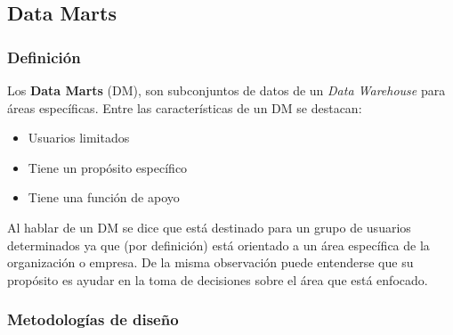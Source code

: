 \documentclass[a4paper,11pt]{article}
\begin{document}
    \subsection{Data Marts}
    
    \subsubsection{Definición}

    Los \textbf{Data Marts} (DM), son subconjuntos de datos de un \textit{Data Warehouse} para áreas específicas.
    Entre las características de un DM se destacan:
    
    \begin{itemize}
      \item Usuarios limitados
      \item Tiene un propósito específico
      \item Tiene una función de apoyo
    \end{itemize}
    
    Al hablar de un DM se dice que está destinado para un grupo de usuarios determinados ya que (por definición) está orientado a un área específica de la
    organización o empresa. De la misma observación puede entenderse que su propósito es ayudar en la toma de decisiones sobre el área que está enfocado.
    
    \subsubsection{Metodologías de diseño}
    
\end{document}
